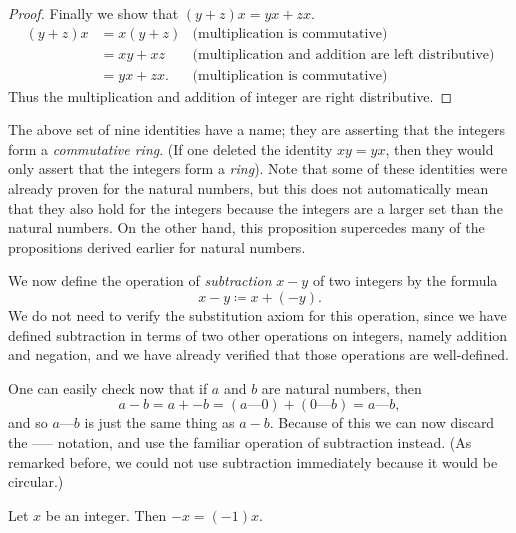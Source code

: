 \begin{proof}
    Finally we show that \((y + z)x = yx + zx\).
    \begin{align*}
        (y + z)x & = x(y + z) & \text{(multiplication is commutative)}                     \\
                 & = xy + xz  & \text{(multiplication and addition are left distributive)} \\
                 & = yx + zx. & \text{(multiplication is commutative)}
    \end{align*}
    Thus the multiplication and addition of integer are right distributive.
\end{proof}

\begin{remark}\label{4.1.7}
    The above set of nine identities have a name; they are asserting that the integers form a \emph{commutative ring}.
    (If one deleted the identity \(xy = yx\), then they would only assert that the integers form a \emph{ring}).
    Note that some of these identities were already proven for the natural numbers, but this does not automatically mean that they also hold for the integers because the integers are a larger set than the natural numbers.
    On the other hand, this proposition supercedes many of the propositions derived earlier for natural numbers.
\end{remark}

\begin{note}
    We now define the operation of \emph{subtraction} \(x - y\) of two integers by the formula
    \[
        x - y \coloneqq x + (-y).
    \]
    We do not need to verify the substitution axiom for this operation, since we have defined subtraction in terms of two other operations on integers, namely addition and negation, and we have already verified that those operations are well-defined.
\end{note}

\begin{note}
    One can easily check now that if \(a\) and \(b\) are natural numbers, then
    \[
        a - b = a + -b = (a \text{---} 0) + (0 \text{---} b) = a \text{---} b,
    \]
    and so \(a \text{---} b\) is just the same thing as \(a - b\).
    Because of this we can now discard the ----- notation, and use the familiar operation of subtraction instead.
    (As remarked before, we could not use subtraction immediately because it would be circular.)
\end{note}

\begin{additional corollary}\label{ac 4.1.3}
Let \(x\) be an integer.
Then \(-x = (-1)x\).
\end{additional corollary}

